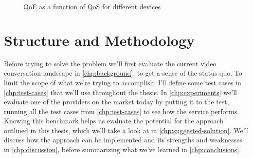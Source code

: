 \begin{figure}
    \centering
    \caption{QoE as a function of QoS for different devices}
    \label{fig:utility}
\end{figure}


\section{Structure and Methodology}

Before trying to solve the problem we'll first evaluate the current video conversation landscape in \autoref{chp:background}, to get a sense of the status quo. To limit the scope of what we're trying to accomplish, I'll define some test cases in \autoref{chp:test-cases} that we'll use throughout the thesis. In \autoref{chp:experiments} we'll evaluate one of the providers on the market today by putting it to the test, running all the test cases from \autoref{chp:test-cases} to see how the service performs. Knowing this benchmark helps us evaluate the potential for the approach outlined in this thesis, which we'll take a look at in \autoref{chp:suggested-solution}. We'll discuss how the approach can be implemented and its strengths and weaknesses in \autoref{chp:discussion}, before summarizing what we've learned in \autoref{chp:conclusions}.



